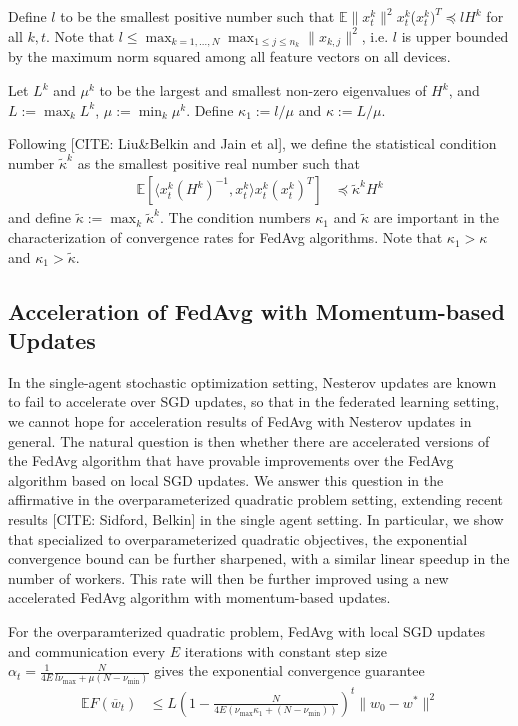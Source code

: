 Define $l$ to be the smallest positive number such that $\mathbb{E}\|x_{t}^{k}\|^{2}$$x_{t}^{k}$($x_{t}^{k})^{T}\preceq lH^{k}$
for all $k,t$. Note that $l\leq\max_{k=1,\dots,N}\max_{1\leq j\leq n_{k}}\|x_{k,j}\|^{2}$,
i.e. $l$ is upper bounded by the maximum norm squared among all feature
vectors on all devices. 

Let $L^{k}$ and $\mu^{k}$ to be the largest and smallest non-zero
eigenvalues of $H^{k}$, and $L:=\max_{k}L^{k}$, $\mu:=\min_{k}\mu^{k}$.
Define $\kappa_{1}:=l/\mu$ and $\kappa:=L/\mu$. 

Following {[}CITE: Liu\&Belkin and Jain et al{]}, we define the statistical
condition number $\tilde{\kappa}^{k}$ as the smallest positive real
number such that 
\begin{align*}
\mathbb{E}\left[\langle x_{t}^{k}(H^{k})^{-1},x_{t}^{k}\rangle x_{t}^{k}(x_{t}^{k})^{T}\right] & \preceq\tilde{\kappa}^{k}H^{k}
\end{align*}
and define $\tilde{\kappa}:=\max_{k}\tilde{\kappa}^{k}$. The condition
numbers $\kappa_{1}$ and $\tilde{\kappa}$ are important in the characterization
of convergence rates for FedAvg algorithms. Note that $\kappa_{1}>\kappa$ and $\kappa_{1}>\tilde{\kappa}$. 

\subsection{Acceleration of FedAvg with Momentum-based Updates}

In the single-agent stochastic optimization setting, Nesterov updates
are known to fail to accelerate over SGD updates, so that in the federated
learning setting, we cannot hope for acceleration results of FedAvg
with Nesterov updates in general. The natural question is then whether
there are accelerated versions of the FedAvg algorithm that have provable
improvements over the FedAvg algorithm based on local SGD updates.
We answer this question in the affirmative in the overparameterized
quadratic problem setting, extending recent results {[}CITE: Sidford,
Belkin{]} in the single agent setting. In particular, we show that
specialized to overparameterized quadratic objectives, the exponential
convergence bound can be further sharpened, with a similar linear
speedup in the number of workers. This rate will then be further improved
using a new accelerated FedAvg algorithm with momentum-based updates. 
\begin{theorem}
	For the overparamterized quadratic problem, FedAvg with local SGD
	updates and communication every $E$ iterations with constant step
	size $\alpha_{t}=\frac{1}{4E}\frac{N}{l\nu_{\max}+\mu(N-\nu_{\min})}$
	gives the exponential convergence guarantee 
	\begin{align*}
	\mathbb{E}F(\overline{w}_{t}) & \leq L(1-\frac{N}{4E(\nu_{\max}\kappa_{1}+(N-\nu_{\min}))})^{t}\|w_{0}-w^{\ast}\|^{2}
	\end{align*}
\end{theorem}
%

